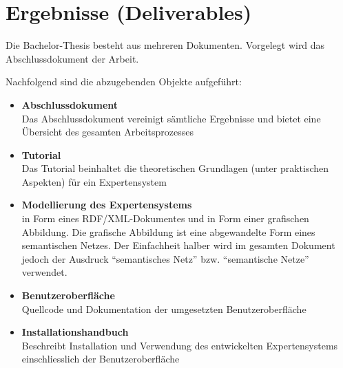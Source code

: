 \section{Ergebnisse (Deliverables)}
\label{sec:admin_ergebniss}
Die Bachelor-Thesis besteht aus mehreren Dokumenten. Vorgelegt wird das Abschlussdokument der Arbeit.

Nachfolgend sind die abzugebenden Objekte aufgeführt:
\begin{itemize}
	\item \textbf{Abschlussdokument} \\
        Das Abschlussdokument vereinigt sämtliche Ergebnisse und bietet eine Übersicht des gesamten Arbeitsprozesses
	\item \textbf{Tutorial} \\
        Das Tutorial beinhaltet die theoretischen Grundlagen (unter praktischen Aspekten) für ein Expertensystem
	\item \textbf{Modellierung des Expertensystems} \\
        in Form eines RDF/XML-Dokumentes und in Form einer grafischen Abbildung. Die grafische Abbildung ist eine abgewandelte Form eines semantischen Netzes. Der Einfachheit halber wird im gesamten Dokument jedoch der Ausdruck ``semantisches Netz'' bzw. ``semantische Netze'' verwendet.
	\item \textbf{Benutzeroberfläche} \\
        Quellcode und Dokumentation der umgesetzten Benutzeroberfläche
	\item \textbf{Installationshandbuch} \\
        Beschreibt Installation und Verwendung des entwickelten Expertensystems einschliesslich der Benutzeroberfläche
\end{itemize}
